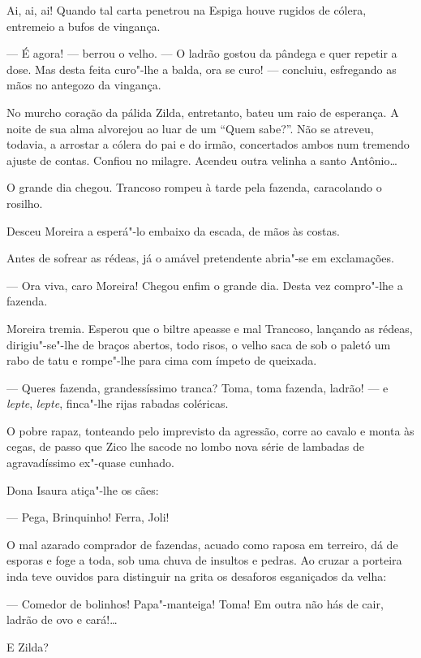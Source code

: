 Ai, ai, ai! Quando tal carta penetrou na Espiga houve rugidos de cólera,
entremeio a bufos de vingança.

--- É agora! --- berrou o velho. --- O ladrão gostou da pândega e quer
repetir a dose. Mas desta feita curo"-lhe a balda, ora se curo! ---
concluiu, esfregando as mãos no antegozo da vingança.

No murcho coração da pálida Zilda, entretanto, bateu um raio de
esperança. A noite de sua alma alvorejou ao luar de um ``Quem sabe?''.
Não se atreveu, todavia, a arrostar a cólera do pai e do irmão,
concertados ambos num tremendo ajuste de contas. Confiou no milagre.
Acendeu outra velinha a santo Antônio\ldots{}

O grande dia chegou. Trancoso rompeu à tarde pela fazenda, caracolando o
rosilho.

Desceu Moreira a esperá"-lo embaixo da escada, de mãos às costas.

Antes de sofrear as rédeas, já o amável pretendente abria"-se em
exclamações.

--- Ora viva, caro Moreira! Chegou enfim o grande dia. Desta vez
compro"-lhe a fazenda.

Moreira tremia. Esperou que o biltre apeasse e mal Trancoso, lançando as
rédeas, dirigiu"-se"-lhe de braços abertos, todo risos, o velho saca de
sob o paletó um rabo de tatu e rompe"-lhe para cima com ímpeto de
queixada.

--- Queres fazenda, grandessíssimo tranca? Toma, toma fazenda, ladrão!
--- e \emph{lepte}, \emph{lepte}, finca"-lhe rijas rabadas coléricas.

O pobre rapaz, tonteando pelo imprevisto da agressão, corre ao cavalo e
monta às cegas, de passo que Zico lhe sacode no lombo nova série de
lambadas de agravadíssimo ex"-quase cunhado.

Dona Isaura atiça"-lhe os cães:

--- Pega, Brinquinho! Ferra, Joli!

O mal azarado comprador de fazendas, acuado como raposa em terreiro, dá
de esporas e foge a toda, sob uma chuva de insultos e pedras. Ao cruzar
a porteira inda teve ouvidos para distinguir na grita os desaforos
esganiçados da velha:

--- Comedor de bolinhos! Papa"-manteiga! Toma! Em outra não hás de cair,
ladrão de ovo e cará!\ldots{}

E Zilda?


